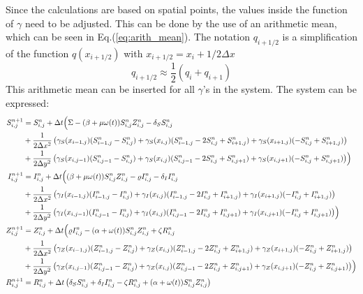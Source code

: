 \documentclass[%
twoside,                 %
final,                   %
10pt]{article}
\begin{document}
Since the calculations are based on spatial points, the values inside the function of $\gamma$ need to be adjusted. This can be done by the use of an arithmetic mean, which can be seen in Eq.(\ref{eq:arith_mean}). The notation $q_{i+1/2}$ is a simplification of the function $q(x_{i+1/2})$ with $x_{i+1/2} = x_i + 1/2 \Delta x$
\begin{equation} \label{eq:arith_mean}
q_{i+1/2} \approx \frac{1}{2}(q_i +q_{i+1})
\end{equation}
This arithmetic mean can be inserted for all $\gamma$'s in the system. The system can be expressed:
\begin{equation} \label{eq:SIZR_disc3}
	\begin{aligned}
    S^{n+1}_{i,j}   &= S^n_{i,j} + \Delta t \Bigl( \Sigma - (\beta+\mu \omega(t))S^{n}_{i,j}Z^{n}_{i,j}- \delta_S S^{n}_{i,j} \\
                    &+ \frac{1}{2\Delta x^2}\left(\gamma_S(x_{i-1,j})(S^{n}_{i-1,j}-S^{n}_{i,j})+\gamma_S(x_{i,j})(S^{n}_{i-1,j}-2S^{n}_{i,j}+S^{n}_{i+1,j})+\gamma_S(x_{i+1,j})(-S^{n}_{i,j}+S^{n}_{i+1,j})\right) \\
                    &+ \frac{1}{2\Delta y^2}\left(\gamma_S(x_{i,j-1})(S^{n}_{i,j-1}-S^{n}_{i,j})+\gamma_S(x_{i,j})(S^{n}_{i,j-1}-2S^{n}_{i,j}+S^{n}_{i,j+1})+\gamma_S(x_{i,j+1})(-S^{n}_{i,j}+S^{n}_{i,j+1})\right)\Bigr)\\
    I^{n+1}_{i,j}   &= I^n_{i,j} + \Delta t \Bigl((\beta+\mu \omega(t))S^{n}_{i,j}Z^{n}_{i,j}-\varrho I^{n}_{i,j}- \delta_I I^{n}_{i,j} \\
                    &+ \frac{1}{2\Delta x^2}\left(\gamma_I(x_{i-1,j})(I^{n}_{i-1,j}-I^{n}_{i,j})+\gamma_I(x_{i,j})(I^{n}_{i-1,j}-2I^{n}_{i,j}+I^{n}_{i+1,j})+\gamma_I(x_{i+1,j})(-I^{n}_{i,j}+I^{n}_{i+1,j})\right) \\
                    &+ \frac{1}{2\Delta y^2}\left(\gamma_I(x_{i,j-1})(I^{n}_{i,j-1}-I^{n}_{i,j})+\gamma_I(x_{i,j})(I^{n}_{i,j-1}-2I^{n}_{i,j}+I^{n}_{i,j+1})+\gamma_I(x_{i,j+1})(-I^{n}_{i,j}+I^{n}_{i,j+1})\right)\Bigr)\\
    Z^{n+1}_{i,j}   &= Z^n_{i,j} +\Delta t \Bigl( \varrho I^{n}_{i,j}-(\alpha+\omega(t))S^{n}_{i,j}Z^{n}_{i,j}+ \zeta R^{n}_{i,j} \\
                    &+ \frac{1}{2\Delta x^2}\left(\gamma_Z(x_{i-1,j})(Z^{n}_{i-1,j}-Z^{n}_{i,j})+\gamma_Z(x_{i,j})(Z^{n}_{i-1,j}-2Z^{n}_{i,j}+Z^{n}_{i+1,j})+\gamma_Z(x_{i+1,j})(-Z^{n}_{i,j}+Z^{n}_{i+1,j})\right) \\
                    &+ \frac{1}{2\Delta y^2}\left(\gamma_Z(x_{i,j-1})(Z^{n}_{i,j-1}-Z^{n}_{i,j})+\gamma_Z(x_{i,j})(Z^{n}_{i,j-1}-2Z^{n}_{i,j}+Z^{n}_{i,j+1})+\gamma_Z(x_{i,j+1})(-Z^{n}_{i,j}+Z^{n}_{i,j+1})\right)\Bigr)\\
    R^{n+1}_{i,j}   &= R^n_{i,j} +\Delta t \left(\delta_S S^{n}_{i,j}+\delta_I I^{n}_{i,j}-\zeta R^{n}_{i,j}+(\alpha+\omega(t))S^{n}_{i,j}Z^{n}_{i,j}\right)
	\end{aligned}
\end{equation}
\end{document}
